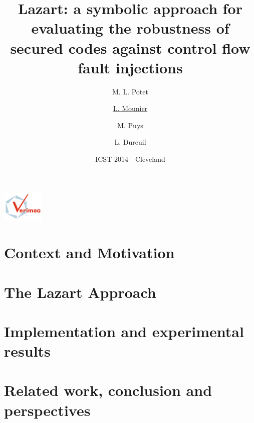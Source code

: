 \documentclass{beamer}
\title{{\bf Lazart: a symbolic approach for evaluating the robustness of secured codes 
             against control flow fault injections}}
\author{M. L. Potet \and \underline{L. Mounier} \and M. Puys \and L. Dureuil}
\institute{{\bf\large VERIMAG} \\ ~ \\ {\bf\large University of Grenoble Alpes, France}}
\date{ICST 2014 - Cleveland }
\begin{document}
\begin{frame}
\titlepage

\noindent \includegraphics[height=1.5cm]{logoverimag.jpg} 
\end{frame}

\section{Context and Motivation}




\section{The Lazart Approach}





\section{Implementation and experimental results}




%

\section{Related work, conclusion and perspectives}

%




\end{document}
